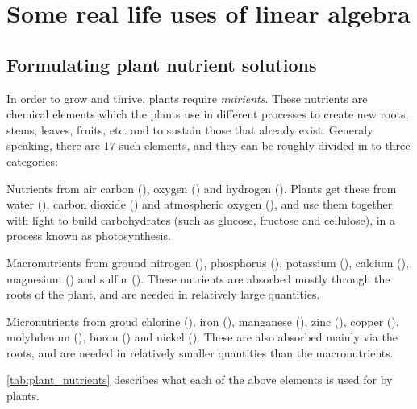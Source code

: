\section{Some real life uses of linear algebra}
\subsection{Formulating plant nutrient solutions}
In order to grow and thrive, plants require \emph{nutrients}. These nutrients are chemical elements which the plants use in different processes to create new roots, stems, leaves, fruits, etc. and to sustain those that already exist. Generaly speaking, there are $17$ such elements, and they can be roughly divided in to three categories:
\begin{descitemize}
	\item[Nutrients from air] carbon (), oxygen () and hydrogen (). Plants get these from water (), carbon dioxide () and atmospheric oxygen (), and use them together with light to build carbohydrates (such as glucose, fructose and cellulose), in a process known as photosynthesis.
	\item[Macronutrients from ground] nitrogen (), phosphorus (), potassium (), calcium (), magnesium () and sulfur (). These nutrients are absorbed mostly through the roots of the plant, and are needed in relatively large quantities.
	\item[Micronutrients from groud] chlorine (), iron (), manganese (), zinc (), copper (), molybdenum (), boron () and nickel (). These are also absorbed mainly via the roots, and are needed in relatively smaller quantities than the macronutrients.
\end{descitemize}

\autoref{tab:plant_nutrients} describes what each of the above elements is used for by plants.


